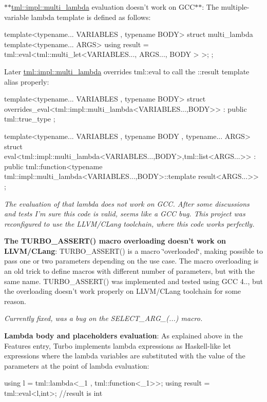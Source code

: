 \begin{DoxyItemize}
\item $\ast$$\ast${\ttfamily \hyperlink{structtml_1_1impl_1_1multi__lambda}{tml\+::impl\+::multi\+\_\+lambda}} evaluation doesn't work on G\+C\+C$\ast$$\ast$\+: The multiple-\/variable lambda template is defined as follows\+: \begin{DoxyVerb}  template<typename... VARIABLES , typename BODY>
  struct multi_lambda
  {
      template<typename... ARGS>
      using result = tml::eval<tml::multi_let<VARIABLES...,
                                              ARGS...,
                                              BODY
                                             >
                              >;
  };
\end{DoxyVerb}


Later {\ttfamily \hyperlink{structtml_1_1impl_1_1multi__lambda}{tml\+::impl\+::multi\+\_\+lambda}} overrides {\ttfamily tml\+::eval} to call the {\ttfamily \+::result} template alias properly\+: \begin{DoxyVerb}  template<typename... VARIABLES , typename BODY>
  struct overrides_eval<tml::impl::multi_lambda<VARIABLES...,BODY>> : public tml::true_type
  {};

  template<typename... VARIABLES , typename BODY , typename... ARGS>
  struct eval<tml::impl::multi_lambda<VARIABLES...,BODY>,tml::list<ARGS...>> :
     public tml::function<typename tml::impl::multi_lambda<VARIABLES...,BODY>::template result<ARGS...>>
  {};
\end{DoxyVerb}


{\itshape The evaluation of that lambda does not work on G\+C\+C. After some discussions and tests I'm sure this code is valid, seems like a G\+C\+C bug. This project was reconfigured to use the L\+L\+V\+M/\+C\+Lang toolchain, where this code works perfectly.}
\item {\bfseries The {\ttfamily T\+U\+R\+B\+O\+\_\+\+A\+S\+S\+E\+R\+T()} macro overloading doesn't work on L\+L\+V\+M/\+C\+Lang}\+: {\ttfamily T\+U\+R\+B\+O\+\_\+\+A\+S\+S\+E\+R\+T()} is a macro \char`\"{}overloaded\char`\"{}, making possible to pass one or two parameters depending on the use case. The macro overloading is an old trick to define macros with different number of parameters, but with the same name. {\ttfamily T\+U\+R\+B\+O\+\_\+\+A\+S\+S\+E\+R\+T()} was implemented and tested using G\+C\+C 4.., but the overloading doesn't work properly on L\+L\+V\+M/\+C\+Lang toolchain for some reason.

{\itshape Currently fixed, was a bug on the {\ttfamily S\+E\+L\+E\+C\+T\+\_\+\+A\+R\+G\+\_(...)} macro.}
\item {\bfseries Lambda body and placeholders evaluation}\+: As explained above in the {\ttfamily Features} entry, Turbo implements lambda expressions as Haskell-\/like let expressions where the lambda variables are substituted with the value of the parameters at the point of lambda evaluation\+: \begin{DoxyVerb} using l = tml::lambda<_1 , tml::function<_1>>;
 using result = tml::eval<l,int>; //result is int
\end{DoxyVerb}



\end{DoxyItemize}

